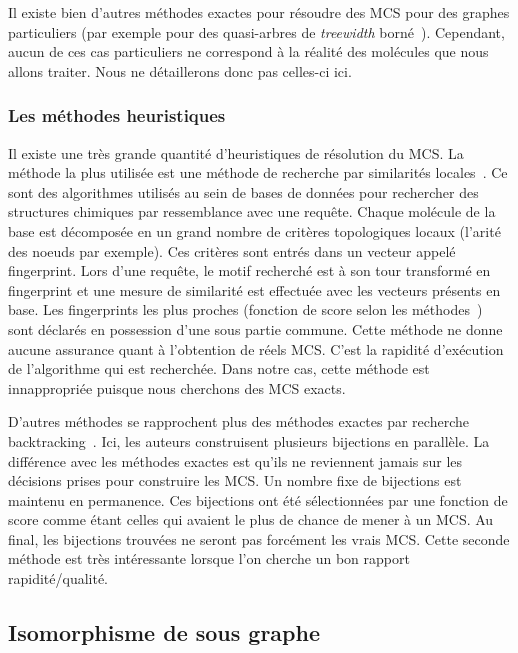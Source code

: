 Il existe bien d'autres méthodes exactes pour résoudre des MCS pour des graphes particuliers (par exemple pour des quasi-arbres de \textit{treewidth} borné~\cite{yamaguchi_finding_2004}).
Cependant, aucun de ces cas particuliers ne correspond à la réalité des molécules que nous allons traiter.
Nous ne détaillerons donc pas celles-ci ici.


\subsubsection{Les méthodes heuristiques}

Il existe une très grande quantité d'heuristiques de résolution du MCS.
La méthode la plus utilisée est une méthode de recherche par similarités locales~\cite{yan_substructure_2005,willett_similarity_2011}.
Ce sont des algorithmes utilisés au sein de bases de données pour rechercher des structures chimiques par ressemblance avec une requête.
Chaque molécule de la base est décomposée en un grand nombre de critères topologiques locaux (l'arité des noeuds par exemple).
Ces critères sont entrés dans un vecteur appelé fingerprint.
Lors d'une requête, le motif recherché est à son tour transformé en fingerprint et une mesure de similarité est effectuée avec les vecteurs présents en base.
Les fingerprints les plus proches (fonction de score selon les méthodes~\cite{maggiora_molecular_2011,ndiaye_cp_2011}) sont déclarés en possession d'une sous partie commune.
Cette méthode ne donne aucune assurance quant à l'obtention de réels MCS.
C'est la rapidité d'exécution de l'algorithme qui est recherchée.
Dans notre cas, cette méthode est innappropriée puisque nous cherchons des MCS exacts.

D'autres méthodes se rapprochent plus des méthodes exactes par recherche backtracking~\cite{grosso_simple_2008, wang_fmcsr:_2013}.
Ici, les auteurs construisent plusieurs bijections en parallèle.
La différence avec les méthodes exactes est qu'ils ne reviennent jamais sur les décisions prises pour construire les MCS.
Un nombre fixe de bijections est maintenu en permanence.
Ces bijections ont été sélectionnées par une fonction de score comme étant celles qui avaient le plus de chance de mener à un MCS.
Au final, les bijections trouvées ne seront pas forcément les vrais MCS.
Cette seconde méthode est très intéressante lorsque l'on cherche un bon rapport rapidité/qualité.


\subsection{Isomorphisme de sous graphe}


